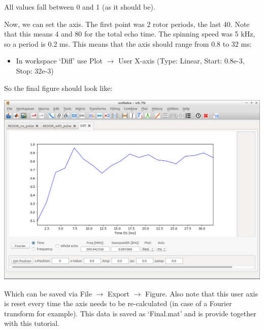 \documentclass[11pt,a4paper]{article}
\begin{document}
All values fall between 0 and 1 (as it should be).

Now, we can set the axis.
The first point was 2 rotor periods, the last 40. Note that this means 4 and 80 for the total echo time.
The spinning speed was 5 kHz, so a period is 0.2 ms.
This means that the axis should range from 0.8 to 32 ms:
\begin{itemize}
\item In workspace `Diff' use Plot $\longrightarrow$ User X-axis (Type: Linear, Start: 0.8e-3, Stop: 32e-3)
\end{itemize}
So the final figure should look like:
\begin{center}
\includegraphics[width=0.8\linewidth]{Figs/Fig6.png}
\end{center}
Which can be saved via File $\longrightarrow$ Export $\longrightarrow$ Figure.
Also note that this user axis is reset every time the axis needs to be re-calculated (in case of a Fourier transform for example).
This data is saved as `Final.mat' and is provide together with this tutorial.
\end{document}
